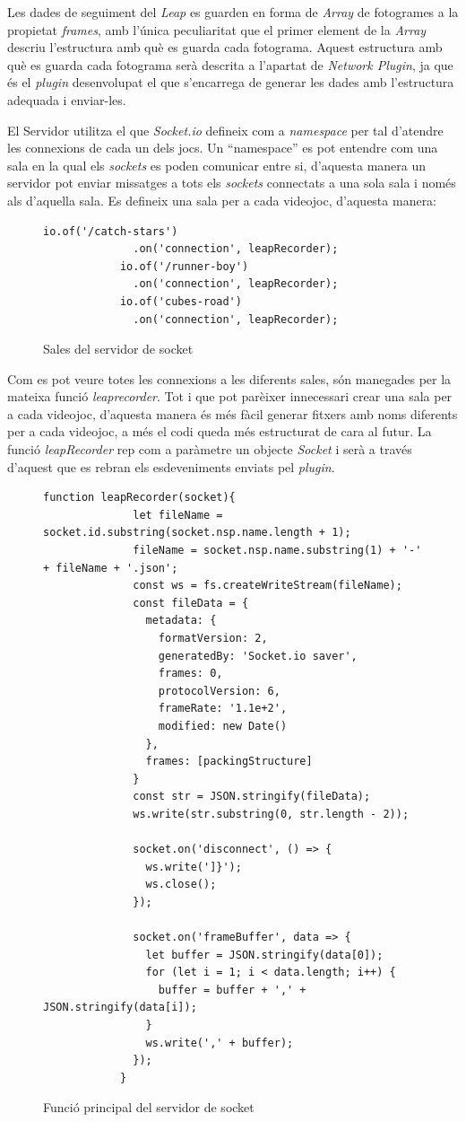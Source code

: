 \documentclass[12pt,a4paper,catalan]{article}
\begin{document}
	Les dades de seguiment del \textit{Leap} es guarden en forma de \textit{Array} de fotogrames a la propietat \textit{frames}, amb l'única peculiaritat que el primer element de la \textit{Array} descriu l'estructura amb què es guarda cada fotograma. Aquest estructura amb què es guarda cada fotograma serà descrita a l'apartat de \textit{Network Plugin}, ja que és el \textit{plugin} desenvolupat el que s'encarrega de generar les dades amb l'estructura adequada i enviar-les.
	
	El Servidor utilitza el que \textit{Socket.io} defineix com a \textit{namespace} per tal d'atendre les connexions de cada un dels jocs. Un “namespace” es pot entendre com una sala en la qual els \textit{sockets} es poden comunicar entre si, d'aquesta manera un servidor pot enviar missatges a tots els \textit{sockets} connectats a una sola sala i només als d'aquella sala.
	Es defineix una sala per a cada videojoc, d'aquesta manera:
	\begin{figure}[H]
		\begin{lstlisting}[gobble=12, tabsize=4]
			io.of('/catch-stars')
			  .on('connection', leapRecorder);
			io.of('/runner-boy')
			  .on('connection', leapRecorder);
			io.of('cubes-road')
			  .on('connection', leapRecorder);
		\end{lstlisting}
		\caption{Sales del servidor de socket}
		\label{fig:socket-namespaces}
	\end{figure}
	Com es pot veure totes les connexions a les diferents sales, són manegades per la mateixa funció \textit{leaprecorder}. Tot i que pot parèixer innecessari crear una sala per a cada videojoc, d'aquesta manera és més fàcil generar fitxers amb noms diferents per a cada videojoc, a més el codi queda més estructurat de cara al futur.
	La funció \textit{leapRecorder} rep com a paràmetre un objecte \textit{Socket} i serà a través d'aquest que es rebran els esdeveniments enviats pel \textit{plugin}.
	\begin{figure}[H]
		\begin{lstlisting}[gobble=12, tabsize=4]
			function leapRecorder(socket){
			  let fileName = socket.id.substring(socket.nsp.name.length + 1);
			  fileName = socket.nsp.name.substring(1) + '-' + fileName + '.json';
			  const ws = fs.createWriteStream(fileName);
			  const fileData = {
			    metadata: {
			      formatVersion: 2,
			      generatedBy: 'Socket.io saver',
			      frames: 0,
			      protocolVersion: 6,
			      frameRate: '1.1e+2',
			      modified: new Date()
			    },
			    frames: [packingStructure]
			  }
			  const str = JSON.stringify(fileData);
			  ws.write(str.substring(0, str.length - 2));
			
			  socket.on('disconnect', () => {
			    ws.write(']}');
			    ws.close();
			  });
			
			  socket.on('frameBuffer', data => {
			    let buffer = JSON.stringify(data[0]);
			    for (let i = 1; i < data.length; i++) {
			      buffer = buffer + ',' + JSON.stringify(data[i]);
			    }
			    ws.write(',' + buffer);
			  });
			}
		\end{lstlisting}
		\caption{Funció principal del servidor de socket}
		\label{fig:leap-recorder}
	\end{figure}
\end{document}
